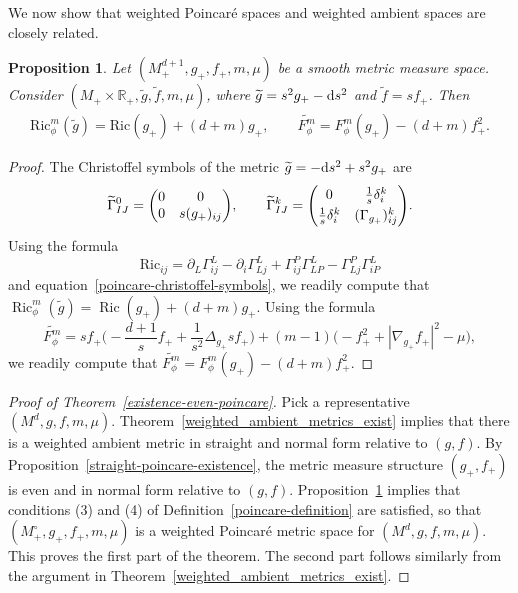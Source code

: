 \documentclass[pdftex]{sigma}
\DeclareMathOperator{\Ric}{Ric}
\numberwithin{equation}{section}
\newtheorem{Proposition}[Theorem]{Proposition}
 { \theoremstyle{definition}
\newtheorem{Definition}[Theorem]{Definition}
\newtheorem{Note}[Theorem]{Note}
\newtheorem{Example}[Theorem]{Example}
\newtheorem{Remark}[Theorem]{Remark} }
\begin{document}
We now show that weighted Poincar\'e spaces and weighted ambient spaces are closely related.

\begin{Proposition}
\label{ricci-poincare-condition}
Let $(M_+^{d+1},g_+,f_+,m,\mu)$ be a smooth metric measure space. Consider $(M_+\times \mathbb{R}_+,\widetilde{g},\widetilde{f},m,\mu)$, where $\widetilde{g}=s^2 g_+-{\rm d}s^2$ and $\widetilde{f}=sf_+$. Then
\begin{gather*}
\mathrm{Ric}_{\phi}^m(\widetilde{g})=\mathrm{Ric}(g_+)+(d+m)g_+,
\qquad
\widetilde{F_\phi^m} =F_\phi^m(g_+)-(d+m)f_+^2.
\end{gather*}
\end{Proposition}

\begin{proof}
The Christoffel symbols of the metric $\widetilde{g}=-{\rm d}s^2+s^2g_+$ are
\begin{equation}
\label{poincare-christoffel-symbols}
\widetilde{\Gamma}_{IJ}^0=\begin{pmatrix}0&0\\0& s(g_+)_{ij} \end{pmatrix}\!,\qquad
\widetilde{\Gamma}_{IJ}^k=\begin{pmatrix}0&\frac{1}{s}\delta_i^k\vspace{1mm}\\\frac{1}{s}\delta_i^k& (\Gamma_{g_+})_{ij}^k \end{pmatrix}\!.
\end{equation}
Using the formula
\begin{equation*}
\mathrm{Ric}_{i j}=\partial_L \Gamma_{i j}^{L}-\partial_i \Gamma_{L j}^{L}+\Gamma_{i j}^{P} \Gamma_{L P}^{L}-\Gamma_{L j}^{P} \Gamma_{i P}^{L}
\end{equation*}
and equation~\eqref{poincare-christoffel-symbols}, we readily compute that $\Ric_{\phi}^m(\widetilde{g})=\Ric(g_+)+(d+m)g_+$.
Using the formula
\begin{equation*}
 \widetilde{F_\phi^m}=sf_+\biggl(-\frac{d+1}{s}f_++\frac{1}{s^2}\Delta_{g_+}sf_+\biggr) +(m-1)\big({-}f_+^2+|\nabla_{g_+}f_+|^2-\mu\big),
\end{equation*}
we readily compute that $\widetilde{F_\phi^m}=F_\phi^m(g_+)-(d+m)f_+^2.$ \qedhere
\end{proof}

\begin{proof}[Proof of Theorem~\ref{existence-even-poincare}]
Pick a representative $(M^d,g,f,m,\mu)$. Theorem~\ref{weighted_ambient_metrics_exist} implies that there is a weighted ambient metric in straight and normal form relative to $(g,f)$. By Proposition~\ref{straight-poincare-existence}, the metric measure structure $(g_+,f_+)$ is even and in normal form relative to $(g,f)$. Proposition~\ref{ricci-poincare-condition} implies that conditions (3) and (4) of Definition~\ref{poincare-definition} are satisfied, so that $(M_+^\circ,g_+,f_+,m,\mu)$ is a weighted Poincar\'e metric space for $(M^d,g,f,m,\mu)$. This proves the first part of the theorem. The second part follows similarly from the argument in Theorem~\ref{weighted_ambient_metrics_exist}.
\end{proof}
\end{document}
